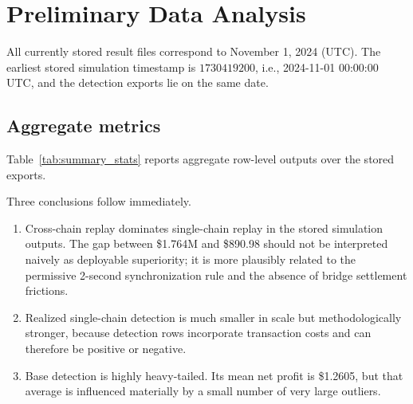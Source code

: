 \documentclass[11pt]{article}
\begin{document}
\section{Preliminary Data Analysis}

All currently stored result files correspond to November 1, 2024 (UTC). The earliest stored simulation timestamp is \(1730419200\), i.e., 2024-11-01 00:00:00 UTC, and the detection exports lie on the same date.

\subsection{Aggregate metrics}

Table~\ref{tab:summary_stats} reports aggregate row-level outputs over the stored exports.

\begin{table}[H]
\centering
\caption{Aggregate metrics over currently stored November 1, 2024 exports. Detection PnL rows count only rows with numeric profit fields.}
\label{tab:summary_stats}
\end{table}

Three conclusions follow immediately.
\begin{enumerate}[label=\arabic*.]
    \item Cross-chain replay dominates single-chain replay in the stored simulation outputs. The gap between \$1.764M and \$890.98 should not be interpreted naively as deployable superiority; it is more plausibly related to the permissive 2-second synchronization rule and the absence of bridge settlement frictions.
    \item Realized single-chain detection is much smaller in scale but methodologically stronger, because detection rows incorporate transaction costs and can therefore be positive or negative.
    \item Base detection is highly heavy-tailed. Its mean net profit is \$1.2605, but that average is influenced materially by a small number of very large outliers.
\end{enumerate}
\end{document}
